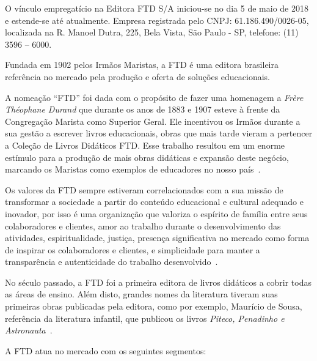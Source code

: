 \documentclass[
  12pt,            %
  openany,
  oneside,
  a4paper,         %
  english,      %
  brazil
]{article}
\numberwithin{figure}{section}
\numberwithin{table}{section}
\begin{document}

O vínculo empregatício na Editora FTD S/A iniciou-se no dia 5 de maio de 2018 e estende-se até atualmente. Empresa registrada pelo CNPJ: 61.186.490/0026-05, localizada na R. Manoel Dutra, 225, Bela Vista, São Paulo - SP, telefone: (11) 3596 – 6000.

Fundada em 1902 pelos Irmãos Maristas, a FTD é uma editora brasileira referência no mercado pela produção e oferta de soluções educacionais.

A nomeação ``FTD'' foi dada com o propósito de fazer uma homenagem a \textit{Frère Théophane Durand} que durante os anos de 1883 e 1907 esteve à frente da Congregação Marista como Superior Geral. Ele incentivou os Irmãos durante a sua gestão a escrever livros educacionais, obras que mais tarde vieram a pertencer a Coleção de Livros Didáticos FTD. Esse trabalho resultou em um enorme estímulo para a produção de mais obras didáticas e expansão deste negócio, marcando os Maristas como exemplos de educadores no nosso país~\cite{site_ftd}.

Os valores da FTD sempre estiveram correlacionados com a sua missão de transformar a sociedade a partir do conteúdo educacional e cultural adequado e inovador, por isso é uma organização que valoriza o espírito de família entre seus colaboradores e clientes, amor ao trabalho durante o desenvolvimento das atividades, espiritualidade, justiça, presença significativa no mercado como forma de inspirar os colaboradores e clientes, e simplicidade para manter a transparência e autenticidade do trabalho desenvolvido~\cite{site_ftd}.

No século passado, a FTD foi a primeira editora de livros didáticos a cobrir todas as áreas de ensino. Além disto, grandes nomes da literatura tiveram suas primeiras obras publicadas pela editora, como por exemplo, Maurício de Sousa, referência da literatura infantil, que publicou os livros \textit{Piteco, Penadinho e Astronauta}~\cite{site_ftd}.

A FTD atua no mercado com os seguintes segmentos:
\end{document}
